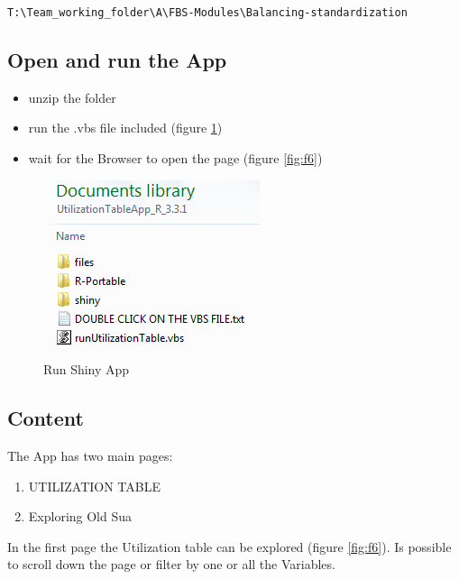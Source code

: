 \documentclass[]{article}
\providecommand{\tightlist}{%
  \setlength{\itemsep}{0pt}\setlength{\parskip}{0pt}}
\begin{document}
\texttt{T:\textbackslash{}Team\_working\_folder\textbackslash{}A\textbackslash{}FBS-Modules\textbackslash{}Balancing-standardization}

\subsection{Open and run the App}\label{open-and-run-the-app}

\begin{itemize}
\tightlist
\item
  unzip the folder
\item
  run the .vbs file included (figure \ref{fig:f5})
\item
  wait for the Browser to open the page (figure \ref{fig:f6})
\end{itemize}

\begin{figure}[H]

{\centering \includegraphics[width=0.6\linewidth]{images/UtilizationTable/05_folderApp} 

}

\caption{\label{fig:f5}Run Shiny App}\label{fig:f5}
\end{figure}

\subsection{Content}\label{content-1}

The App has two main pages:

\begin{enumerate}
\def\labelenumi{\arabic{enumi}.}
\tightlist
\item
  UTILIZATION TABLE
\item
  Exploring Old Sua
\end{enumerate}

In the first page the Utilization table can be explored (figure
\ref{fig:f6}). Is possible to scroll down the page or filter by one or
all the Variables.
\end{document}
